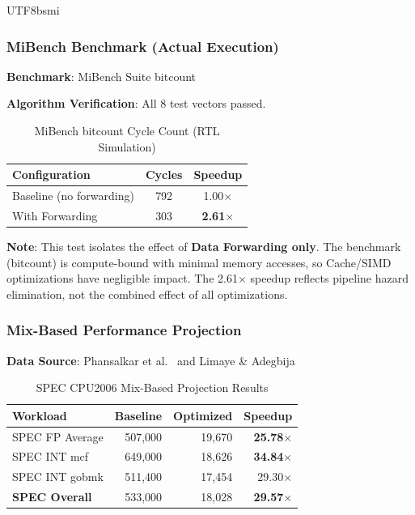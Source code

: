 \documentclass[journal,twoside]{IEEEtran}
\begin{document}
\begin{CJK}{UTF8}{bsmi}
\subsubsection{MiBench Benchmark (Actual Execution)}
\textbf{Benchmark}: MiBench Suite bitcount~\cite{guthaus2001mibench}

\textbf{Algorithm Verification}: All 8 test vectors passed.

\begin{table}[!t]
\centering
\caption{MiBench bitcount Cycle Count (RTL Simulation)}
\label{tab:mibench}
\footnotesize
\begin{tabular}{@{}lcc@{}}
\toprule
\textbf{Configuration} & \textbf{Cycles} & \textbf{Speedup} \\
\midrule
Baseline (no forwarding) & 792 & 1.00$\times$ \\
With Forwarding & 303 & \textbf{2.61$\times$} \\
\bottomrule
\end{tabular}
\end{table}

\textbf{Note}: This test isolates the effect of \textbf{Data Forwarding only}. The benchmark (bitcount) is compute-bound with minimal memory accesses, so Cache/SIMD optimizations have negligible impact. The 2.61$\times$ speedup reflects pipeline hazard elimination, not the combined effect of all optimizations.

\subsubsection{Mix-Based Performance Projection}
\textbf{Data Source}: Phansalkar et al.~\cite{phansalkar2007analysis} and Limaye \& Adegbija~\cite{limaye2018workload}

\begin{table}[!t]
\centering
\caption{SPEC CPU2006 Mix-Based Projection Results}
\label{tab:specresults}
\footnotesize
\begin{tabular}{@{}lrrr@{}}
\toprule
\textbf{Workload} & \textbf{Baseline} & \textbf{Optimized} & \textbf{Speedup} \\
\midrule
SPEC FP Average & 507,000 & 19,670 & \textbf{25.78$\times$} \\
SPEC INT mcf & 649,000 & 18,626 & \textbf{34.84$\times$} \\
SPEC INT gobmk & 511,400 & 17,454 & 29.30$\times$ \\
\textbf{SPEC Overall} & 533,000 & 18,028 & \textbf{29.57$\times$} \\
\bottomrule
\end{tabular}
\end{table}


\end{CJK}
\end{document}
